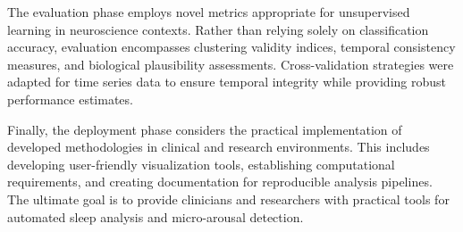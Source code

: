 \documentclass[a4paper,12pt,twoside]{article}
\begin{document}
The evaluation phase employs novel metrics appropriate for unsupervised learning in neuroscience contexts. Rather than relying solely on classification accuracy, evaluation encompasses clustering validity indices, temporal consistency measures, and biological plausibility assessments. Cross-validation strategies were adapted for time series data to ensure temporal integrity while providing robust performance estimates.

Finally, the deployment phase considers the practical implementation of developed methodologies in clinical and research environments. This includes developing user-friendly visualization tools, establishing computational requirements, and creating documentation for reproducible analysis pipelines. The ultimate goal is to provide clinicians and researchers with practical tools for automated sleep analysis and micro-arousal detection.
\end{document}
